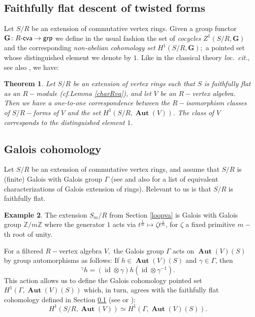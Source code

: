 \documentclass{article}
\newtheorem{thm}{Theorem}[section]
\theoremstyle{definition}
\newtheorem{ex}[thm]{Example}
\def\id{\ensuremath{\operatorname{id}}}
\def\BAut{\ensuremath{\operatorname{\mathbf{Aut}}}}
\def\Rcva{\ensuremath{R\text{-\textup{\textsf{cva}}}}}
\def\grp{\ensuremath{\text{\textup{\textsf{grp}}}}}
\begin{document}
 \subsection{Faithfully flat descent of twisted forms}\label{ffdesc}




	Let $S/R$ be an extension of commutative vertex rings.
	Given a group functor $\mathbf G \colon \Rcva \to \grp$ we  define in the usual fashion \cite{Waterhouse} the set of {\it cocycles} $Z^1(S/R, \mathbf G)$ and the corresponding  \textit{non-abelian cohomology set} $H^1(S/R, \mathbf G);$ a pointed set whose distinguished element we denote by $1.$ Like in the classical theory {\it loc.\ cit.}, see also \cite{Car}, we have:


\begin{thm}\label{descent}
    Let $S/R$ be an extension of vertex rings such that $S$ is faithfully flat as an $R-$module (cf.\@ Lemma \ref{charRva}), and let $V$ be an $R-$vertex algebra.
    Then we have a one-to-one correspondence between the $R-$isomorphism classes of $S/R-$forms of $V$ and the set $H^1(S/R, \BAut(V))$.
    The class of $V$ corresponds to the distinguished element $1$.
\end{thm}

    \subsection{Galois cohomology}

Let $S/R$ be an extension of commutative vertex rings, and assume that $S/R$ is (finite)  Galois with Galois group $\Gamma$ (see \cite[\@5.6--7]{Knus} and also \cite[\@1.3]{CHR} for a list of equivalent characterizations of Galois extension of rings). Relevant to us is that $S/R$ is faithfully flat.
    \begin{ex}
    The extension $S_m/R$ from Section \ref{loopva} is Galois with Galois group $\mathbb Z/m \mathbb Z$ where the generator $1$ acts via $t^{\frac{1}{m}} \mapsto \zeta t^{\frac{1}{m}}$, for $\zeta$ a fixed primitive $m-$th root of unity.
\end{ex}

For a filtered $R-$vertex algebra $V,$  the Galois group $\Gamma$ acts on  $\BAut(V)(S)$ by group automorphisms as follows: If $h \in \BAut(V)(S)$ and $\gamma \in \Gamma$, then 
\[ {}^\gamma h = (\id \otimes \gamma) h (\id \otimes \gamma^{-1}).\] 
This action allows us to define the Galois cohomology pointed set  $H^1(\Gamma, \BAut(V)(S))$ which, in turn, agrees with the faithfully flat cohomology defined in Section \ref{ffdesc} (see \cite{Waterhouse} or \cite{Knus}): 
\[ H^1 (S/R, \BAut(V)) \simeq H^1(\Gamma, \BAut(V)(S)). \]
\end{document}
